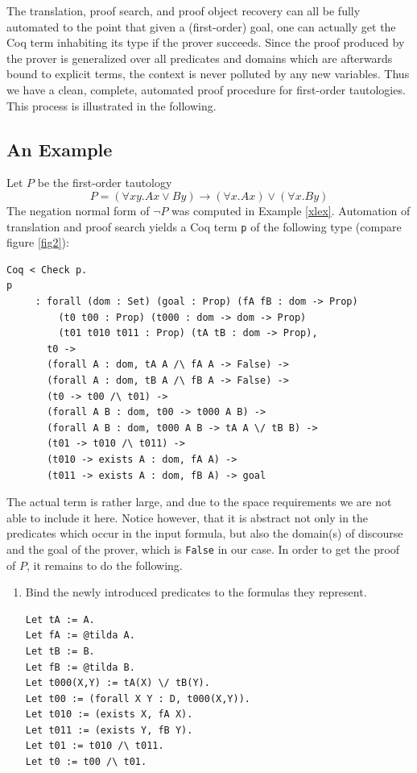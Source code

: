 \documentclass[a4paper,11pt]{article}
\begin{document}
The translation, proof search, and proof object recovery can all be fully
automated to the point that given a (first-order) goal, one can actually
get the Coq term inhabiting its type if the prover succeeds.  Since the
proof produced by the prover is generalized over all predicates and 
domains which are afterwards bound to explicit terms, the context is never 
polluted by any new variables.  Thus we have a clean, complete, automated
proof procedure for first-order tautologies.  This process is illustrated 
in the following.
\subsection{An Example}
\begin{ex} \label{poex}
Let $P$ be the first-order tautology
\[P = (\forall x y. Ax \lor By) \to (\forall x. Ax) \lor (\forall x. By)\]
The negation normal form of $\lnot P$ was computed in Example \ref{xlex}. 
 Automation
of translation and proof search yields a Coq term {\tt p} of the following type
(compare figure \ref{fig2}):

\begin{verbatim}
Coq < Check p.
p
     : forall (dom : Set) (goal : Prop) (fA fB : dom -> Prop) 
         (t0 t00 : Prop) (t000 : dom -> dom -> Prop) 
         (t01 t010 t011 : Prop) (tA tB : dom -> Prop),
       t0 ->
       (forall A : dom, tA A /\ fA A -> False) ->
       (forall A : dom, tB A /\ fB A -> False) ->
       (t0 -> t00 /\ t01) ->
       (forall A B : dom, t00 -> t000 A B) ->
       (forall A B : dom, t000 A B -> tA A \/ tB B) ->
       (t01 -> t010 /\ t011) ->
       (t010 -> exists A : dom, fA A) ->
       (t011 -> exists A : dom, fB A) -> goal
\end{verbatim}

The actual term is rather large, and due to the space requirements we are not able
to include it here.  Notice however, that it is abstract not only in the predicates
which occur in the input formula, but also the domain(s) of discourse and the
goal of the prover, which is {\tt False} in our case.
\newpage
In order to get the proof of $P$, it remains to do the following.
\begin{enumerate}
\item
Bind the newly introduced predicates to the formulas they represent.
\begin{Verbatim}[commandchars=@\{\}]
Let tA := A.
Let fA := @tilda A.
Let tB := B.
Let fB := @tilda B.
Let t000(X,Y) := tA(X) \/ tB(Y).
Let t00 := (forall X Y : D, t000(X,Y)).
Let t010 := (exists X, fA X).
Let t011 := (exists Y, fB Y).
Let t01 := t010 /\ t011.
Let t0 := t00 /\ t01.
\end{Verbatim}


\end{enumerate}
\end{ex}
\end{document}
